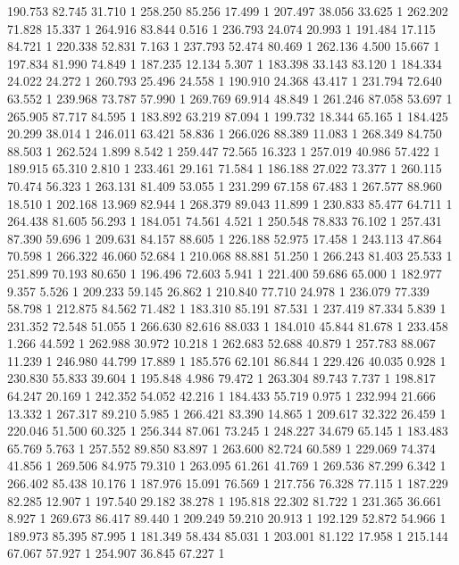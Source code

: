 	190.753	82.745	31.710	1
	258.250	85.256	17.499	1
	207.497	38.056	33.625	1
	262.202	71.828	15.337	1
	264.916	83.844	0.516	1
	236.793	24.074	20.993	1
	191.484	17.115	84.721	1
	220.338	52.831	7.163	1
	237.793	52.474	80.469	1
	262.136	4.500	15.667	1
	197.834	81.990	74.849	1
	187.235	12.134	5.307	1
	183.398	33.143	83.120	1
	184.334	24.022	24.272	1
	260.793	25.496	24.558	1
	190.910	24.368	43.417	1
	231.794	72.640	63.552	1
	239.968	73.787	57.990	1
	269.769	69.914	48.849	1
	261.246	87.058	53.697	1
	265.905	87.717	84.595	1
	183.892	63.219	87.094	1
	199.732	18.344	65.165	1
	184.425	20.299	38.014	1
	246.011	63.421	58.836	1
	266.026	88.389	11.083	1
	268.349	84.750	88.503	1
	262.524	1.899	8.542	1
	259.447	72.565	16.323	1
	257.019	40.986	57.422	1
	189.915	65.310	2.810	1
	233.461	29.161	71.584	1
	186.188	27.022	73.377	1
	260.115	70.474	56.323	1
	263.131	81.409	53.055	1
	231.299	67.158	67.483	1
	267.577	88.960	18.510	1
	202.168	13.969	82.944	1
	268.379	89.043	11.899	1
	230.833	85.477	64.711	1
	264.438	81.605	56.293	1
	184.051	74.561	4.521	1
	250.548	78.833	76.102	1
	257.431	87.390	59.696	1
	209.631	84.157	88.605	1
	226.188	52.975	17.458	1
	243.113	47.864	70.598	1
	266.322	46.060	52.684	1
	210.068	88.881	51.250	1
	266.243	81.403	25.533	1
	251.899	70.193	80.650	1
	196.496	72.603	5.941	1
	221.400	59.686	65.000	1
	182.977	9.357	5.526	1
	209.233	59.145	26.862	1
	210.840	77.710	24.978	1
	236.079	77.339	58.798	1
	212.875	84.562	71.482	1
	183.310	85.191	87.531	1
	237.419	87.334	5.839	1
	231.352	72.548	51.055	1
	266.630	82.616	88.033	1
	184.010	45.844	81.678	1
	233.458	1.266	44.592	1
	262.988	30.972	10.218	1
	262.683	52.688	40.879	1
	257.783	88.067	11.239	1
	246.980	44.799	17.889	1
	185.576	62.101	86.844	1
	229.426	40.035	0.928	1
	230.830	55.833	39.604	1
	195.848	4.986	79.472	1
	263.304	89.743	7.737	1
	198.817	64.247	20.169	1
	242.352	54.052	42.216	1
	184.433	55.719	0.975	1
	232.994	21.666	13.332	1
	267.317	89.210	5.985	1
	266.421	83.390	14.865	1
	209.617	32.322	26.459	1
	220.046	51.500	60.325	1
	256.344	87.061	73.245	1
	248.227	34.679	65.145	1
	183.483	65.769	5.763	1
	257.552	89.850	83.897	1
	263.600	82.724	60.589	1
	229.069	74.374	41.856	1
	269.506	84.975	79.310	1
	263.095	61.261	41.769	1
	269.536	87.299	6.342	1
	266.402	85.438	10.176	1
	187.976	15.091	76.569	1
	217.756	76.328	77.115	1
	187.229	82.285	12.907	1
	197.540	29.182	38.278	1
	195.818	22.302	81.722	1
	231.365	36.661	8.927	1
	269.673	86.417	89.440	1
	209.249	59.210	20.913	1
	192.129	52.872	54.966	1
	189.973	85.395	87.995	1
	181.349	58.434	85.031	1
	203.001	81.122	17.958	1
	215.144	67.067	57.927	1
	254.907	36.845	67.227	1
